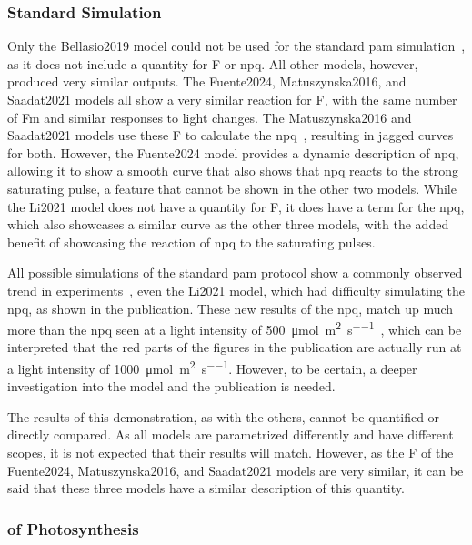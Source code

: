\subsubsection{Standard  Simulation}

Only the Bellasio2019 model could not be used for the standard \gls{pam} simulation~, as it does not include a quantity for \gls{F} or \gls{npq}. All other models, however, produced very similar outputs. The Fuente2024, Matuszynska2016, and Saadat2021 models all show a very similar reaction for \gls{F}, with the same number of \gls{Fm} and similar responses to light changes. The Matuszynska2016 and Saadat2021 models use these \gls{F} to calculate the \gls{npq}~, resulting in jagged curves for both. However, the Fuente2024 model provides a dynamic description of \gls{npq}, allowing it to show a smooth curve that also shows that \gls{npq} reacts to the strong saturating pulse, a feature that cannot be shown in the other two models. While the Li2021 model does not have a quantity for \gls{F}, it does have a term for the \gls{npq}, which also showcases a similar curve as the other three models, with the added benefit of showcasing the reaction of \gls{npq} to the saturating pulses.

All possible simulations of the standard \gls{pam} protocol show a commonly observed trend in experiments~\cite{matuszynskaMathematicalModelNonphotochemical2016,niesChlorophyllFluorescenceHow2021}, even the Li2021 model, which had difficulty simulating the \gls{npq}, as shown in the publication. These new results of the \gls{npq}, match up much more than the \gls{npq} seen at a light intensity of \qty{500}{\micro\mol\per\meter\squared\per\second}~, which can be interpreted that the red parts of the figures in the publication are actually run at a light intensity of \qty{1000}{\micro\mol\per\meter\squared\per\second}. However, to be certain, a deeper investigation into the model and the publication is needed.

The results of this demonstration, as with the others, cannot be quantified or directly compared. As all models are parametrized differently and have different scopes, it is not expected that their results will match. However, as the \gls{F} of the Fuente2024, Matuszynska2016, and Saadat2021 models are very similar, it can be said that these three models have a similar description of this quantity.

\subsubsection{ of Photosynthesis}


